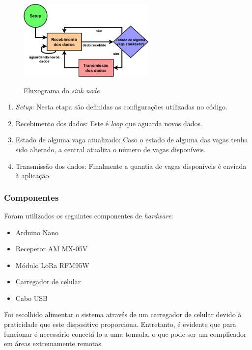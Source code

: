 \documentclass[oneside,openright,12pt]{ufsm_2015} %
\begin{document}
    \begin{figure}[ht]
     	    \caption{\label{exepretex} Fluxograma do \textit{sink node}}
            \centering
            \includegraphics[width=0.6\textwidth]{figuras/central.png}
            \vspace{\baselineskip} %
            \label{fig:flux-sink-node}
    \end{figure}
    
    \begin{enumerate}
        \item \textit{Setup}: Nesta etapa são definidas as configurações utilizadas no código.
        \item Recebimento dos dados: Este é \textit{loop} que aguarda novos dados. 
        \item Estado de alguma vaga atualizado: Caso o estado de alguma das vagas tenha sido alterado, a central atualiza o número de vagas disponíveis.
        \item Transmissão dos dados: Finalmente a quantia de vagas disponíveis é enviada à aplicação.
    \end{enumerate}
    
    \subsubsection{Componentes}
    Foram utilizados os seguintes componentes de \textit{hardware}:
    \begin{itemize}
        \item Arduino Nano
        \item Recepetor AM MX-05V
        \item Módulo LoRa RFM95W
        \item Carregador de celular
        \item Cabo USB
    \end{itemize}
    
    Foi escolhido alimentar o sistema através de um carregador de celular devido à praticidade que este dispositivo proporciona. Entretanto, é evidente que para funcionar é necessário conectá-lo a uma tomada, o que pode ser um complicador em áreas extremamente remotas.
    
\end{document}
